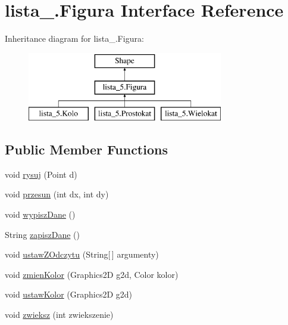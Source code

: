 \hypertarget{interfacelista__5_1_1_figura}{}\section{lista\+\_.\+Figura Interface Reference}
\label{interfacelista__5_1_1_figura}
Inheritance diagram for lista\+\_.\+Figura\+:\begin{figure}[H]
\begin{center}
\leavevmode
\includegraphics[height=3.000000cm]{interfacelista__5_1_1_figura}
\end{center}
\end{figure}
\subsection*{Public Member Functions}
\begin{DoxyCompactItemize}
\item 
void \mbox{\hyperlink{interfacelista__5_1_1_figura_a1b238957bac675c57febc970067dfd6d}{rysuj}} (Point d)
\item 
void \mbox{\hyperlink{interfacelista__5_1_1_figura_a72f085618cf604e8b1632ea733043861}{przesun}} (int dx, int dy)
\item 
void \mbox{\hyperlink{interfacelista__5_1_1_figura_aaddd90c61fd1632655cb031efafe1a7d}{wypisz\+Dane}} ()
\item 
String \mbox{\hyperlink{interfacelista__5_1_1_figura_a9d60d64b495755a3e48a3eee549a728d}{zapisz\+Dane}} ()
\item 
void \mbox{\hyperlink{interfacelista__5_1_1_figura_a75b72b51014348d839e1f2b81525f264}{ustaw\+Z\+Odczytu}} (String\mbox{[}$\,$\mbox{]} argumenty)
\item 
void \mbox{\hyperlink{interfacelista__5_1_1_figura_aeb0982dc44348dd1fde9266d9d476ed0}{zmien\+Kolor}} (Graphics2D g2d, Color kolor)
\item 
void \mbox{\hyperlink{interfacelista__5_1_1_figura_a3cc13bf7229b288d743be7903b3b61a4}{ustaw\+Kolor}} (Graphics2D g2d)
\item 
void \mbox{\hyperlink{interfacelista__5_1_1_figura_a6813d7ac31e5118bcb34b9b29868ce5f}{zwieksz}} (int zwiekszenie)
\end{DoxyCompactItemize}


